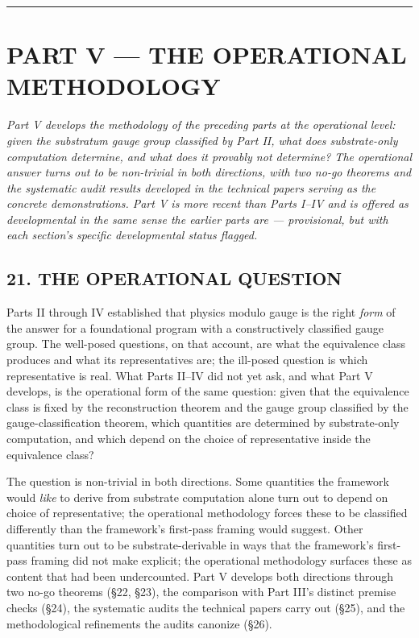 \documentclass[
]{article}
\begin{document}
\begin{center}\rule{0.5\linewidth}{0.5pt}\end{center}

\hypertarget{part-v-the-operational-methodology}{%
\section{PART V --- THE OPERATIONAL
METHODOLOGY}\label{part-v-the-operational-methodology}}

\emph{Part V develops the methodology of the preceding parts at the
operational level: given the substratum gauge group classified by Part
II, what does substrate-only computation determine, and what does it
provably not determine? The operational answer turns out to be
non-trivial in both directions, with two no-go theorems and the
systematic audit results developed in the technical papers serving as
the concrete demonstrations. Part V is more recent than Parts I--IV and
is offered as developmental in the same sense the earlier parts are ---
provisional, but with each section's specific developmental status
flagged.}

\hypertarget{the-operational-question}{%
\subsection{21. THE OPERATIONAL
QUESTION}\label{the-operational-question}}

Parts II through IV established that physics modulo gauge is the right
\emph{form} of the answer for a foundational program with a
constructively classified gauge group. The well-posed questions, on that
account, are what the equivalence class produces and what its
representatives are; the ill-posed question is which representative is
real. What Parts II--IV did not yet ask, and what Part V develops, is
the operational form of the same question: given that the equivalence
class is fixed by the reconstruction theorem and the gauge group
classified by the gauge-classification theorem, which quantities are
determined by substrate-only computation, and which depend on the choice
of representative inside the equivalence class?

The question is non-trivial in both directions. Some quantities the
framework would \emph{like} to derive from substrate computation alone
turn out to depend on choice of representative; the operational
methodology forces these to be classified differently than the
framework's first-pass framing would suggest. Other quantities turn out
to be substrate-derivable in ways that the framework's first-pass
framing did not make explicit; the operational methodology surfaces
these as content that had been undercounted. Part V develops both
directions through two no-go theorems (§22, §23), the comparison with
Part III's distinct premise checks (§24), the systematic audits the
technical papers carry out (§25), and the methodological refinements the
audits canonize (§26).
\end{document}

